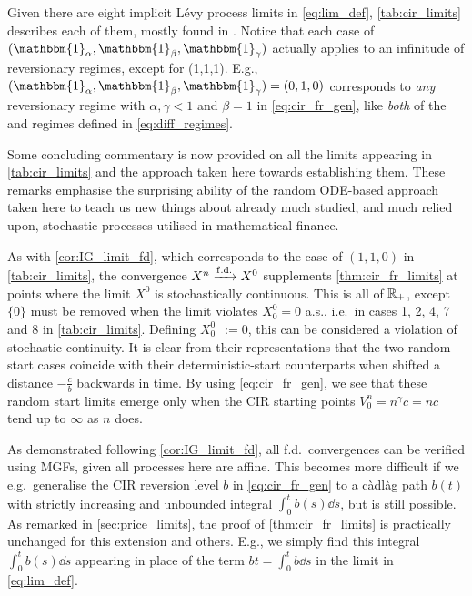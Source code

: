 Given there are eight implicit L\'evy process limits in \autoref{eq:lim_def}, \autoref{tab:cir_limits} describes each of them, mostly found in \cite{applebaum_2009}. Notice that each case of $(\mathbbm{1}_\alpha,\mathbbm{1}_\beta,\mathbbm{1}_\gamma)$ actually applies to an infinitude of reversionary regimes, except for (1,1,1). E.g., $(\mathbbm{1}_\alpha,\mathbbm{1}_\beta,\mathbbm{1}_\gamma)=(0,1,0)$ corresponds to \emph{any} reversionary regime with $\alpha,\gamma<1$ and $\beta=1$ in \autoref{eq:cir_fr_gen}, like \emph{both} of the \cite{heston_1993} and \cite{fouque_2011} regimes defined in \autoref{eq:diff_regimes}.

Some concluding commentary is now provided on all the limits appearing in \autoref{tab:cir_limits} and the approach taken here towards establishing them. These remarks emphasise the surprising ability of the random ODE-based approach taken here to teach us new things about already much studied, and much relied upon, stochastic processes utilised in mathematical finance.

As with \autoref{cor:IG_limit_fd}, which corresponds to the \cite{mechkov_2015} case of $(1,1,0)$ in \autoref{tab:cir_limits}, the convergence $X^n\xrightarrow{\mathrm{f.d.}} X^0$ supplements \autoref{thm:cir_fr_limits} at points where the limit $X^0$ is stochastically continuous. This is all of $\mathbb{R}_+$, except $\{0\}$ must be removed when the limit violates $X^0_0=0$ a.s., i.e.~in cases 1, 2, 4, 7 and 8 in \autoref{tab:cir_limits}. Defining $X^0_{0_-}:=0$, this can be considered a violation of stochastic continuity. It is clear from their representations that the two random start cases coincide with their deterministic-start counterparts when shifted a distance $-\frac{c}{b}$ backwards in time. By using \autoref{eq:cir_fr_gen}, we see that these random start limits emerge only when the CIR starting points $V^n_0=n^\gamma c=nc$ tend up to $\infty$ as $n$ does.

As demonstrated following \autoref{cor:IG_limit_fd}, all f.d.~convergences can be verified using MGFs, given all processes here are affine. This becomes more difficult if we e.g.~generalise the CIR reversion level $b$ in \autoref{eq:cir_fr_gen} to a c\`adl\`ag path $b(t)$ with strictly increasing and unbounded integral $\int_0^t b(s)\dd s$, but is still possible. As remarked in \autoref{sec:price_limits}, the proof of \autoref{thm:cir_fr_limits} is practically unchanged for this extension and others. E.g., we simply find this integral $\int_0^t b(s)\dd s$ appearing in place of the term $bt=\int_0^t b\dd s$ in the limit in \autoref{eq:lim_def}.

